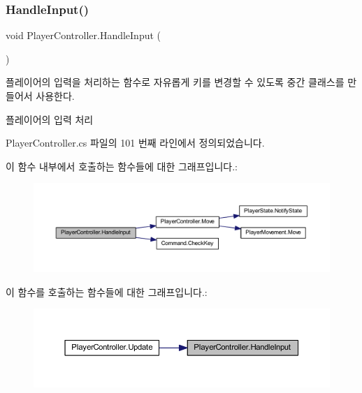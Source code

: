 \subsubsection{\texorpdfstring{HandleInput()}{HandleInput()}}
{\footnotesize\ttfamily void Player\+Controller.\+Handle\+Input (\begin{DoxyParamCaption}{ }\end{DoxyParamCaption})}



플레이어의 입력을 처리하는 함수로 자유롭게 키를 변경할 수 있도록 중간 클래스를 만들어서 사용한다. 

플레이어의 입력 처리 

Player\+Controller.\+cs 파일의 101 번째 라인에서 정의되었습니다.


\begin{DoxyCode}{0}

\end{DoxyCode}
이 함수 내부에서 호출하는 함수들에 대한 그래프입니다.\+:\nopagebreak
\begin{figure}[H]
\begin{center}
\leavevmode
\includegraphics[width=350pt]{dc/dde/class_player_controller_a5ebfe098b2dc258ca8349e6951766883_cgraph}
\end{center}
\end{figure}
이 함수를 호출하는 함수들에 대한 그래프입니다.\+:\nopagebreak
\begin{figure}[H]
\begin{center}
\leavevmode
\includegraphics[width=350pt]{dc/dde/class_player_controller_a5ebfe098b2dc258ca8349e6951766883_icgraph}
\end{center}
\end{figure}
